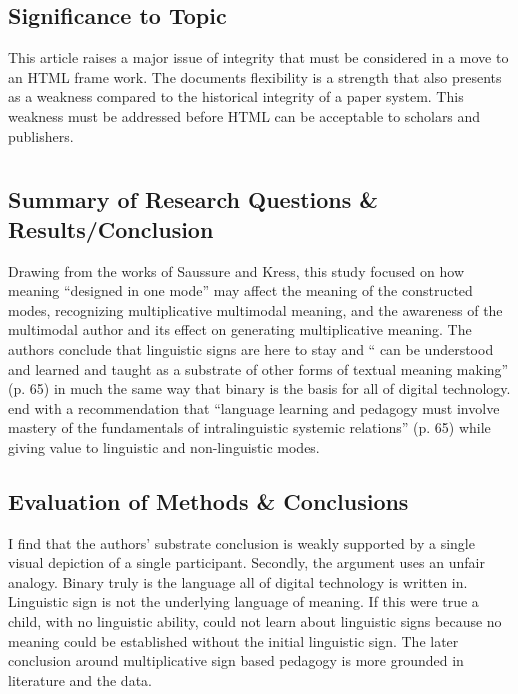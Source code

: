 \documentclass[leavefloats]{apa6e}\usepackage[]{graphicx}\usepackage[]{color}
\begin{document}
\subsection{Significance to Topic} %
This article raises a major issue of integrity that must be considered in a move to an HTML frame work.  The documents flexibility is a strength that also presents as a weakness compared to the historical integrity of a paper system.  This weakness must be addressed before HTML can be acceptable to scholars and publishers.


 \section{\textcite{Malinowski2011}}





\regpar



\subsection{Summary of Research Questions \& Results/Conclusion} %
Drawing from the works of  Saussure and Kress, this study focused on how meaning ``designed in one mode'' may affect the meaning of the constructed modes, recognizing multiplicative multimodal meaning, and the awareness of the multimodal author and its effect on generating multiplicative meaning.  The authors conclude that linguistic signs are here to stay and `` can be understood and learned and taught as a substrate of other forms of textual meaning making'' (p. 65) in much the same way that binary is the basis for all of digital technology.  \textcite{Malinowski2011} end with a recommendation that ``language learning and pedagogy must involve mastery of the fundamentals of intralinguistic systemic relations'' (p. 65) while giving value to linguistic and non-linguistic modes.


\subsection{Evaluation of Methods \& Conclusions} %
I find that the authors' substrate conclusion is weakly supported by a single visual depiction of a single participant.  Secondly, the argument uses an unfair analogy.  Binary truly is the language all of digital technology is written in.  Linguistic sign is not the underlying language of meaning.  If this were true a child, with no linguistic ability, could not learn about linguistic signs because no meaning could be established without the initial linguistic sign. The later conclusion around multiplicative sign based pedagogy is more grounded in literature and the data.
\end{document}
